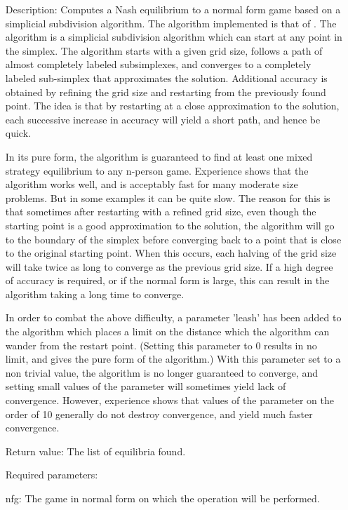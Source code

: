 \begin{itemize}
\bd
\item
[Description:] Computes a Nash equilibrium to a normal form game based
on a simplicial subdivision algorithm.  The algorithm implemented is
that of \cite{VTH:1987}.  The 
algorithm is a simplicial subdivision algorithm which can start at any
point in the simplex.  The algorithm starts with a given grid size,
follows a path of almost completely labeled subsimplexes, and
converges to a completely labeled sub-simplex that approximates the
solution.  Additional accuracy is obtained by refining the grid size
and restarting from the previously found point.  The idea is that by
restarting at a close approximation to the solution, each successive
increase in accuracy will yield a short path, and hence be quick.

In its pure form, the algorithm is guaranteed to find at least one
mixed strategy equilibrium to any n-person game.  Experience shows
that the algorithm works well, and is acceptably fast for many
moderate size problems.  But in some examples it can be quite slow.
The reason for this is that sometimes after restarting with a refined
grid size, even though the starting point is a good approximation to
the solution, the algorithm will go to the boundary of the simplex
before converging back to a point that is close to the original
starting point.  When this occurs, each halving of the grid size will
take twice as long to converge as the previous grid size.  If a high
degree of accuracy is required, or if the normal form is large, this
can result in the algorithm taking a long time to converge.

In order to combat the above difficulty, a parameter 'leash' has been
added to the algorithm which places a limit on the distance which the
algorithm can wander from the restart point. (Setting this parameter
to 0 results in no limit, and gives the pure form of the algorithm.)
With this parameter set to a non trivial value, the algorithm is no
longer guaranteed to converge, and setting small values of the
parameter will sometimes yield lack of convergence.  However,
experience shows that values of the parameter on the order of 10
generally do not destroy convergence, and yield much faster
convergence.

\item
[Return value:] The list of equilibria found.
\item
[Required parameters:]\hfil\null

\bd
\item
[nfg:] The game in normal form on which the operation will be
performed.
\ed


\end{itemize}
